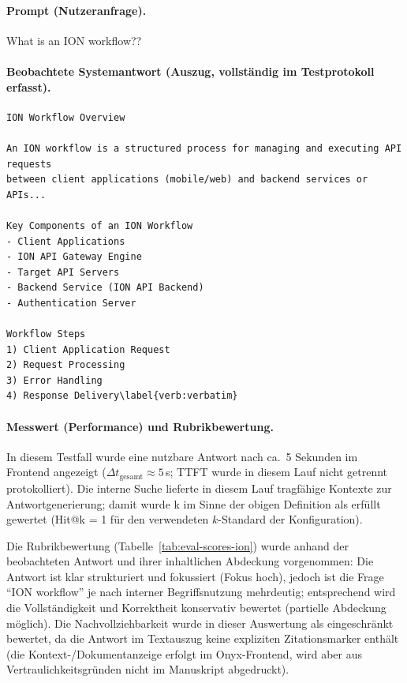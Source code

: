 \paragraph{Prompt (Nutzeranfrage).}
\begin{MyVerbatim}
What is an ION workflow??
\end{MyVerbatim}

\paragraph{Beobachtete Systemantwort (Auszug, vollständig im Testprotokoll erfasst).}
\begin{verbatim}
ION Workflow Overview

An ION workflow is a structured process for managing and executing API requests
between client applications (mobile/web) and backend services or APIs...

Key Components of an ION Workflow
- Client Applications
- ION API Gateway Engine
- Target API Servers
- Backend Service (ION API Backend)
- Authentication Server

Workflow Steps
1) Client Application Request
2) Request Processing
3) Error Handling
4) Response Delivery\label{verb:verbatim}
\end{verbatim}

\paragraph{Messwert (Performance) und Rubrikbewertung.}
In diesem Testfall wurde eine nutzbare Antwort nach ca.\ 5 Sekunden im Frontend angezeigt ($\Delta t_{\text{gesamt}} \approx 5$\,s; TTFT wurde in diesem Lauf nicht getrennt protokolliert).
Die interne Suche lieferte in diesem Lauf tragfähige Kontexte zur Antwortgenerierung; damit wurde k im Sinne der obigen Definition als erfüllt gewertet (Hit@k = 1 für den verwendeten $k$-Standard der Konfiguration).

Die Rubrikbewertung (Tabelle~\ref{tab:eval-scores-ion}) wurde anhand der beobachteten Antwort und ihrer inhaltlichen Abdeckung vorgenommen:
Die Antwort ist klar strukturiert und fokussiert (Fokus hoch), jedoch ist die Frage \enquote{ION workflow} je nach interner Begriffsnutzung mehrdeutig; entsprechend wird die Vollständigkeit und Korrektheit konservativ bewertet (partielle Abdeckung möglich).
Die Nachvollziehbarkeit wurde in dieser Auswertung als eingeschränkt bewertet, da die Antwort im Textauszug keine expliziten Zitationsmarker enthält (die Kontext-/Dokumentanzeige erfolgt im Onyx-Frontend, wird aber aus Vertraulichkeitsgründen nicht im Manuskript abgedruckt).

